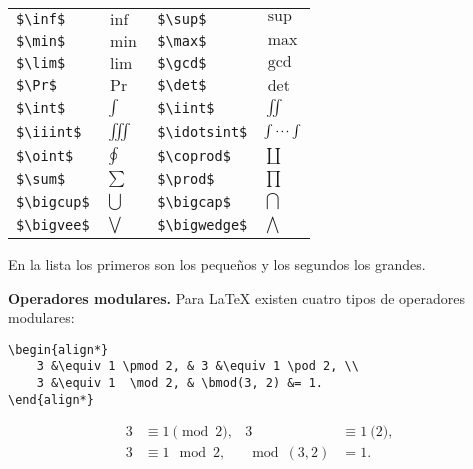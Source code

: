 \begin{longtable}{llll}
	\lstinline|$\inf$|       & $\inf$       & \lstinline|$\sup$|        & $\sup$ \\
	\lstinline|$\min$|       & $\min$       & \lstinline|$\max$|        & $\max$ \\
	\lstinline|$\lim$|       & $\lim$       & \lstinline|$\gcd$|        & $\gcd$ \\
	\lstinline|$\Pr$|        & $\Pr$        & \lstinline|$\det$|        & $\det$ \\
	\lstinline|$\int$|       & $\int$       & \lstinline|$\iint$|       & $\iint$ \\
	\lstinline|$\iiint$|     & $\iiint$     & \lstinline|$\idotsint$|   & $\idotsint$ \\
	\lstinline|$\oint$|      & $\oint$      & \lstinline|$\coprod$|     & $\coprod$ \\
	\lstinline|$\sum$|       & $\sum$       & \lstinline|$\prod$|       & $\prod$ \\
	\lstinline|$\bigcup$|    & $\bigcup$    & \lstinline|$\bigcap$|     & $\bigcap$ \\
	\lstinline|$\bigvee$|    & $\bigvee$    & \lstinline|$\bigwedge$|   & $\bigwedge$ \\
\end{longtable}

En la lista los primeros son los pequeños y los segundos los grandes.

\textbf{Operadores modulares.} Para \LaTeX{} existen cuatro tipos de operadores modulares:
\begin{lstlisting}
\begin{align*}
	3 &\equiv 1 \pmod 2, & 3 &\equiv 1 \pod 2, \\
	3 &\equiv 1  \mod 2, & \bmod(3, 2) &= 1.
\end{align*}
\end{lstlisting}
\begin{align*}
	3 &\equiv 1 \pmod 2, & 3 &\equiv 1 \pod 2, \\
	3 &\equiv 1  \mod 2, & \bmod(3, 2) &= 1.
\end{align*}

